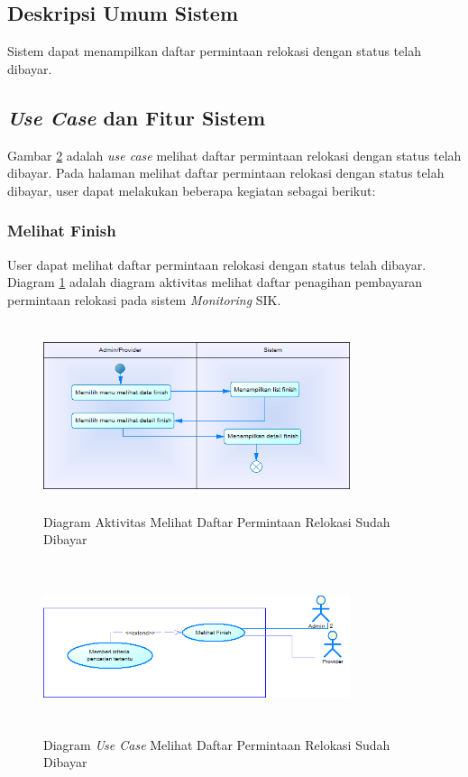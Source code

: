 \subsection{Deskripsi Umum Sistem}
\tab Sistem dapat menampilkan daftar permintaan relokasi dengan status telah dibayar.
\subsection{\textit{Use Case} dan Fitur Sistem}
Gambar \ref{figure:use_case_melihat_finish} adalah \textit{use case} melihat daftar permintaan relokasi dengan status telah dibayar. Pada halaman melihat daftar permintaan relokasi dengan status telah dibayar, user dapat melakukan beberapa kegiatan sebagai berikut:
	\subsubsection{Melihat Finish}
	User dapat melihat daftar permintaan relokasi dengan status telah dibayar. Diagram \ref{figure:activity_melihat_finish} adalah diagram aktivitas melihat daftar penagihan pembayaran permintaan relokasi pada sistem \textit{Monitoring} SIK.
	\begin{figure}[h]
	\centerline {\includegraphics[width=9cm,height=5.5cm]{bab4/ActivityDiagram_MelihatFinish.png}}
	\caption{Diagram Aktivitas Melihat Daftar Permintaan Relokasi Sudah Dibayar}
	\label{figure:activity_melihat_finish}
	\end{figure}

	\begin{figure}[h!]
	\centerline
	{\includegraphics[width=9cm,height=5cm]{bab4/use-case-melihat-finish.png}}
	\caption{Diagram \textit{Use Case} Melihat Daftar Permintaan Relokasi Sudah Dibayar}
	\label{figure:use_case_melihat_finish}
	\end{figure}
	
